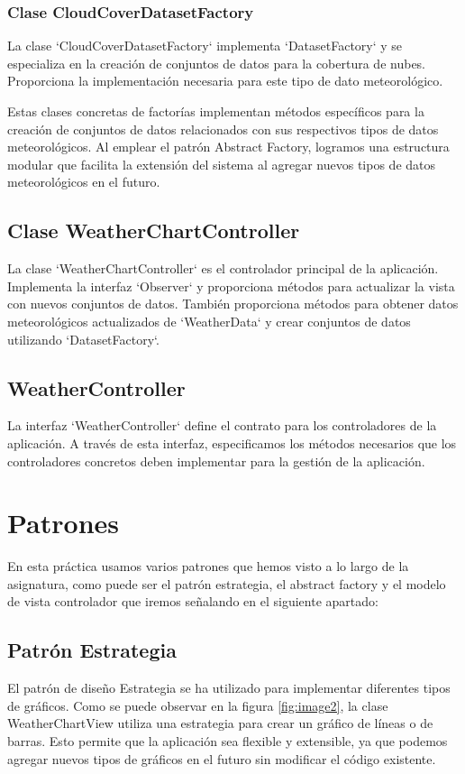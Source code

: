 \documentclass{article}
\begin{document}
\subsubsection{Clase CloudCoverDatasetFactory}
La clase `CloudCoverDatasetFactory` implementa `DatasetFactory` y se especializa en la creación de conjuntos de datos para la cobertura de nubes. Proporciona la implementación necesaria para este tipo de dato meteorológico.


Estas clases concretas de factorías implementan métodos específicos para la creación de conjuntos de datos relacionados con sus respectivos tipos de datos meteorológicos. Al emplear el patrón Abstract Factory, logramos una estructura modular que facilita la extensión del sistema al agregar nuevos tipos de datos meteorológicos en el futuro.

\subsection{Clase WeatherChartController}
La clase `WeatherChartController` es el controlador principal de la aplicación. Implementa la interfaz `Observer` y proporciona métodos para actualizar la vista con nuevos conjuntos de datos. También proporciona métodos para obtener datos meteorológicos actualizados de `WeatherData` y crear conjuntos de datos utilizando `DatasetFactory`.

\subsection{WeatherController}
La interfaz `WeatherController` define el contrato para los controladores de la aplicación. A través de esta interfaz, especificamos los métodos necesarios que los controladores concretos deben implementar para la gestión de la aplicación.

\section{Patrones}
En esta práctica usamos varios patrones que hemos visto a lo largo de la asignatura, como puede ser el patrón estrategia, el abstract factory y el modelo de vista controlador que iremos señalando en el siguiente apartado:

\subsection{Patrón Estrategia}
El patrón de diseño Estrategia se ha utilizado para implementar diferentes tipos de gráficos. Como se puede observar en la figura \ref{fig:image2}, la clase WeatherChartView utiliza una estrategia para crear un gráfico de líneas o de barras. Esto permite que la aplicación sea flexible y extensible, ya que podemos agregar nuevos tipos de gráficos en el futuro sin modificar el código existente.
\end{document}
